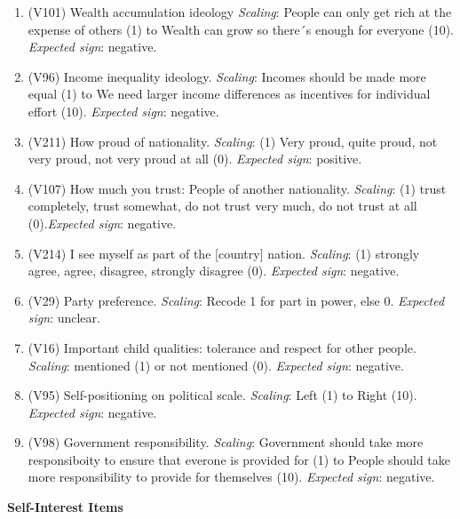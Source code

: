 \documentclass[]{article}
\begin{document}
\begin{enumerate}
  \item (V101) Wealth accumulation ideology \textit{Scaling}: People can only get rich at the expense of others (1) to Wealth can grow so there´s enough for everyone (10).  \textit{Expected sign}: negative.
  \item (V96) Income inequality ideology. \textit{Scaling}: Incomes should be made more equal (1) to We need larger income differences as incentives for individual effort (10). \textit{Expected sign}: negative.
  \item (V211) How proud of nationality. \textit{Scaling}: (1) Very proud, quite proud, not very proud, not very proud at all (0). \textit{Expected sign}: positive. 
  \item (V107) How much you trust: People of another nationality. \textit{Scaling}: (1) trust completely, trust somewhat, do not trust very much, do not trust at all (0).\textit{Expected sign}: negative.
  \item (V214) I see myself as part of the [country] nation. \textit{Scaling}: (1) strongly agree, agree, disagree, strongly disagree (0). \textit{Expected sign}: negative.
  \item (V29) Party preference. \textit{Scaling}: Recode 1 for part in power, else 0. \textit{Expected sign}: unclear.
  \item (V16) Important child qualities: tolerance and respect for other people. \textit{Scaling}: mentioned (1) or not mentioned (0). \textit{Expected sign}: negative.
  \item (V95) Self-positioning on political scale. \textit{Scaling}: Left (1) to Right (10). \textit{Expected sign}: negative.
  \item (V98) Government responsibility. \textit{Scaling}: Government should take more responsiboity to ensure that everone is provided for (1) to People should take more responsibility to provide for themselves (10). \textit{Expected sign}: negative.
\end{enumerate}

\textbf{Self-Interest Items}
\end{document}
